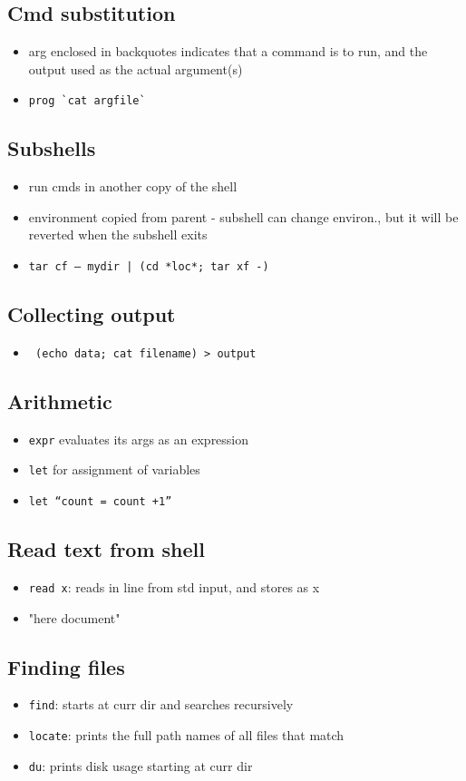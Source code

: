 \documentclass[10pt, multicolumn, a4paper]{article}
\begin{document}
\begin{multicols}{2}
	\subsection*{Cmd substitution}
	\begin{itemize}
	\item arg enclosed in backquotes indicates that a command is to run, and the output used as the actual argument(s)
	\item \verb|prog `cat argfile`|
	\end{itemize}
	\subsection*{Subshells}
	\begin{itemize}
	\item run cmds in another copy of the shell
	\item environment copied from parent - subshell can change environ., but it will be reverted when the subshell exits
	\item \texttt{tar cf – mydir | (cd *loc*; tar xf -)}
	\end{itemize}
	\subsection*{Collecting output}
	\begin{itemize}
	\item \verb| (echo data; cat filename) > output|
	\end{itemize}
	\subsection*{Arithmetic}
	\begin{itemize}
	\item \verb|expr| evaluates its args as an expression
	\item \verb|let| for assignment of variables 
	\item \verb|let “count = count +1”|
	\end{itemize}
	\subsection*{Read text from shell}
	\begin{itemize}
	\item \verb|read x|: reads in line from std input, and stores as x
	\item "here document"
	\end{itemize}
	\subsection*{Finding files}
	\begin{itemize}
	\item \verb|find|: starts at curr dir and searches recursively
	\item \verb|locate|: prints the full path names of all files that match
	\item \verb|du|: prints disk usage starting at curr dir
	\end{itemize}

\end{multicols}
\end{document}
